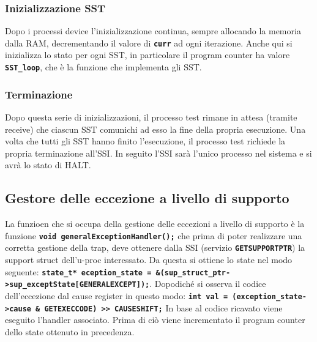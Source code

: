 \documentclass{article}
\begin{document}
\subsubsection{Inizializzazione SST}
Dopo i processi device l'inizializzazione continua, sempre allocando la memoria dalla RAM, decrementando 
il valore di \texttt{\textbf{curr}} ad ogni iterazione. Anche qui si inizializza lo stato per ogni SST, in 
particolare il program counter ha valore \texttt{\textbf{SST\_loop}}, che è la funzione che implementa 
gli SST.

\subsubsection{Terminazione}
Dopo questa serie di inizializzazioni, il processo test rimane in attesa (tramite receive) che ciascun SST 
comunichi ad esso la fine della propria esecuzione. Una volta che tutti gli SST hanno finito l'esecuzione, 
il processo test richiede la propria terminazione all'SSI. In seguito l'SSI sarà l'unico processo nel 
sistema e si avrà lo stato di HALT.

\newpage
\subsection{Gestore delle eccezione a livello di supporto}
La funzioen che si occupa della gestione delle eccezioni a livello di supporto è la funzione 
\texttt{\textbf{void generalExceptionHandler();}} che prima di poter realizzare una corretta gestione 
della trap, deve ottenere dalla SSI (servizio \texttt{\textbf{GETSUPPORTPTR}}) la support struct 
dell'u-proc interessato. Da questa si ottiene lo state nel modo seguente: \newline 
\texttt{\textbf{state\_t* eception\_state = \&(sup\_struct\_ptr->sup\_exceptState[GENERALEXCEPT]);}}.
Dopodiché si osserva il codice dell'eccezione dal cause register in questo modo: \newline
\texttt{\textbf{int val = (exception\_state->cause \& GETEXECCODE) >> CAUSESHIFT;}} \newline
In base al codice ricavato viene eseguito l'handler associato. Prima di ciò viene incrementato il program 
counter dello state ottenuto in precedenza.
\end{document}
